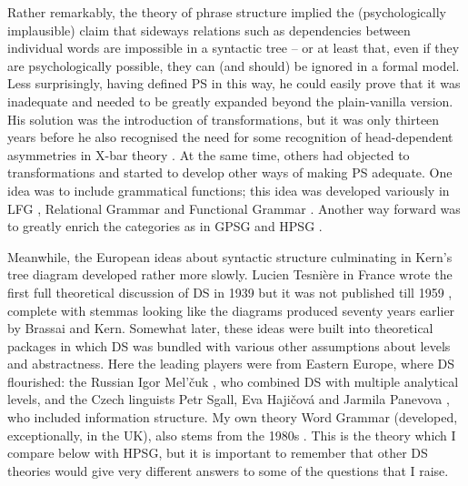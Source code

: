 \documentclass[output=paper]{langscibook}
\begin{document}
Rather remarkably, the theory of phrase structure implied the (psychologically implausible) claim that sideways relations such as dependencies between individual words are impossible in a syntactic tree – or at least that, even if they are psychologically possible, they can (and should) be ignored in a formal model. Less surprisingly, having defined PS in this way, he could easily prove that it was inadequate and needed to be greatly expanded beyond the plain-vanilla version. His solution was the introduction of transformations, but it was only thirteen years before he also recognised the need for some recognition of head-dependent asymmetries in X-bar theory \citep{Chomsky70a}. At the same time, others had objected to transformations and started to develop other ways of making PS adequate. One idea was to include grammatical functions; this idea was developed variously in LFG \citep{Bresnan78a,Bresnan2001a}, Relational Grammar \citep{PP83a-u,Blake1990} and Functional Grammar \citep{Dik1989,Siewierska1991}. Another way forward was to greatly enrich the categories \citep{Harman63a} as in GPSG \citep{GKPS85a} and HPSG \citep{ps2}. 

Meanwhile, the European ideas about syntactic structure culminating in Kern’s tree diagram developed rather more slowly. Lucien Tesnière in France wrote the first full theoretical discussion of DS in 1939 but it was not published till 1959 \citep{Tesniere59a-u,Tesniere2015a-u}, complete with stemmas looking like the diagrams produced seventy years earlier by Brassai and Kern. Somewhat later, these ideas were built into theoretical packages in which DS was bundled with various other assumptions about levels and abstractness. Here the leading players were from Eastern Europe, where DS flourished: the Russian Igor Mel’čuk \citep{Melcuk88a-u}, who combined DS with multiple analytical levels, and the Czech linguists Petr Sgall, Eva Hajičová and Jarmila Panevova \citep{Sgall&co1986}, who included information structure. My own theory Word Grammar (developed, exceptionally, in the UK), also stems from the 1980s \citep{Hudson84a-u,Hudson90a-u,Sugayama2002,Hudson2007a-u,Gisborne2008,Rosta2008,Gisborne2010,Hudson2010b-u,Gisborne2011,Duran-Eppler2011,TraugottTrousdale2013,Duran-Eppler&co2016,Hudson2016,Hudson2017,Hudson2017a,Gisborne2019}. This is the theory which I compare below with HPSG, but it is important to remember that other DS theories would give very different answers to some of the questions that I raise.
\end{document}
